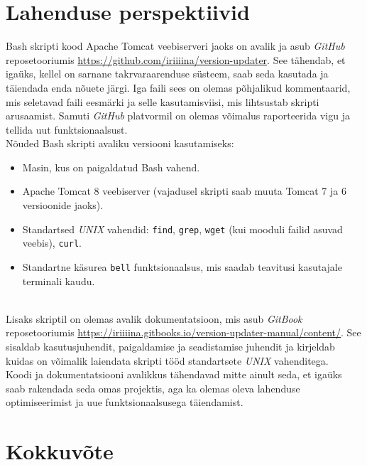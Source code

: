 \documentclass[12pt]{report}
\newcommand{\code}[1]{\texttt{#1}}
\begin{document}
  \newpage
  
  \section{Lahenduse perspektiivid}
  
  Bash skripti kood Apache Tomcat veebiserveri jaoks on avalik ja asub \textit{GitHub} reposetooriumis \url{https://github.com/iriiiina/version-updater}. See tähendab, et igaüks, kellel on sarnane takrvaraarenduse süsteem, saab seda kasutada ja täiendada enda nõuete järgi. Iga faili sees on olemas põhjalikud kommentaarid, mis seletavad faili eesmärki ja selle kasutamisviisi, mis lihtsustab skripti arusaamist. Samuti \textit{GitHub} platvormil on olemas võimalus raporteerida vigu ja tellida uut funktsionaalsust.\\
  
  Nõuded Bash skripti avaliku versiooni kasutamiseks:
  \begin{itemize}
    \item Masin, kus on paigaldatud Bash vahend.
    \item Apache Tomcat 8 veebiserver (vajadusel skripti saab muuta Tomcat 7 ja 6 versioonide jaoks).
    \item Standartsed \textit{UNIX} vahendid: \code{find}, \code{grep}, \code{wget} (kui mooduli failid asuvad veebis), \code{curl}.
    \item Standartne käsurea \code{bell} funktsionaalsus, mis saadab teavitusi kasutajale terminali kaudu.
  \end{itemize}\\
  
  Lisaks skriptil on olemas avalik dokumentatsioon, mis asub \textit{GitBook} reposetooriumis \url{https://iriiiina.gitbooks.io/version-updater-manual/content/}. See sisaldab kasutusjuhendit, paigaldamise ja seadistamise juhendit ja kirjeldab kuidas on võimalik laiendata skripti tööd standartsete \textit{UNIX} vahenditega.\\
  
  Koodi ja dokumentatsiooni avalikkus tähendavad mitte ainult seda, et igaüks saab rakendada seda omas projektis, aga ka olemas oleva lahenduse optimiseerimist ja uue funktsionaalsusega täiendamist.
  
  \newpage
  
  \section*{Kokkuvõte}
  \label{kokkuvote}
\end{document}
